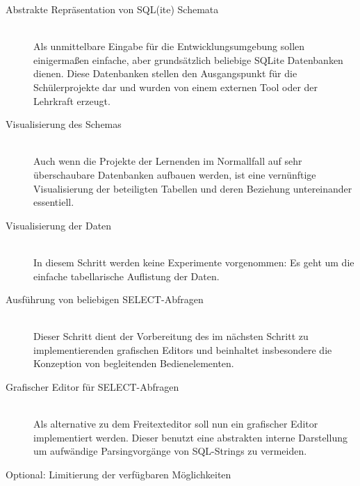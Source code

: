 \documentclass[paper=a4,fontsize=11pt,parskip=half]{scrartcl}
\begin{document}
\begin{description}
\item[Abstrakte Repräsentation von SQL(ite) Schemata] \hfill\\
  Als unmittelbare Eingabe für die Entwicklungsumgebung sollen einigermaßen einfache, aber grundsätzlich beliebige SQLite Datenbanken dienen. Diese Datenbanken stellen den Ausgangspunkt für die Schülerprojekte dar und wurden von einem externen Tool oder der Lehrkraft erzeugt.
\item[Visualisierung des Schemas] \hfill\\
  Auch wenn die Projekte der Lernenden im Normallfall auf sehr überschaubare Datenbanken aufbauen werden, ist eine vernünftige Visualisierung der beteiligten Tabellen und deren Beziehung untereinander essentiell.
\item[Visualisierung der Daten] \hfill\\
  In diesem Schritt werden keine Experimente vorgenommen: Es geht um die einfache tabellarische Auflistung der Daten.
\item[Ausführung von beliebigen SELECT-Abfragen] \hfill\\
  Dieser Schritt dient der Vorbereitung des im nächsten Schritt zu implementierenden grafischen Editors und beinhaltet insbesondere die Konzeption von begleitenden Bedienelementen.
\item[Grafischer Editor für SELECT-Abfragen] \hfill\\
  Als alternative zu dem Freitexteditor soll nun ein grafischer Editor implementiert werden. Dieser benutzt eine abstrakten interne Darstellung um aufwändige Parsingvorgänge von SQL-Strings zu vermeiden.
\item[Optional: Limitierung der verfügbaren Möglichkeiten] \hfill
  
\end{description}

\listoftodos[Notes]

\printbibliography
\end{document}
